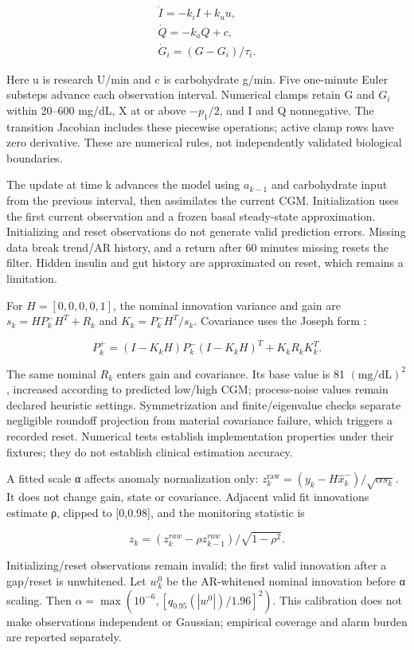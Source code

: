 \documentclass[journal,10pt,letterpaper]{IEEEtran}
\begin{document}
\[\begin{gathered}
\dot I=-k_iI+k_u u,\\ \dot Q=-k_aQ+c,\\
\dot G_i=(G-G_i)/\tau_i. 
\end{gathered}\tag{1}\]

Here u is research U/min and c is carbohydrate g/min. Five one-minute
Euler substeps advance each observation interval. Numerical clamps
retain G and \(G_i\) within 20--600 mg/dL, X at or above −\(p_1\)/2, and
I and Q nonnegative. The transition Jacobian includes these piecewise
operations; active clamp rows have zero derivative. These are numerical
rules, not independently validated biological boundaries.

The update at time k advances the model using \(a_{k-1}\) and
carbohydrate input from the previous interval, then assimilates the
current CGM. Initialization uses the first current observation and a
frozen basal steady-state approximation. Initializing and reset
observations do not generate valid prediction errors. Missing data break
trend/AR history, and a return after 60 minutes missing resets the
filter. Hidden insulin and gut history are approximated on reset, which
remains a limitation.

For \(H=[0,0,0,0,1]\), the nominal innovation variance and gain are
\(s_k=HP_k^-H^T+R_k\) and \(K_k=P_k^-H^T/s_k\). Covariance uses the
Joseph form \cite{R13}:

\[
P_k^+=(I-K_kH)P_k^-(I-K_kH)^T+K_kR_kK_k^T. \tag{2}
\]

The same nominal \(R_k\) enters gain and covariance. Its base value is
81 \((\mathrm{mg/dL})^2\), increased according to predicted low/high
CGM; process-noise values remain declared heuristic settings.
Symmetrization and finite/eigenvalue checks separate negligible roundoff
projection from material covariance failure, which triggers a recorded
reset. Numerical tests establish implementation properties under their
fixtures; they do not establish clinical estimation accuracy.

A fitted scale α affects anomaly normalization only:
\(z_k^{\mathrm{raw}}=(y_k-H\hat x_k^-)/\sqrt{\alpha s_k}\). It does not
change gain, state or covariance. Adjacent valid fit innovations
estimate ρ, clipped to {[}0,0.98{]}, and the monitoring statistic is

\[
z_k=(z_k^{raw}-\rho z_{k-1}^{raw})/\sqrt{1-\rho^2}. \tag{3}
\]

Initializing/reset observations remain invalid; the first valid
innovation after a gap/reset is unwhitened. Let \(w_k^0\) be the
AR-whitened nominal innovation before α scaling. Then
\(\alpha=\max(10^{-6},[q_{0.95}(|w^0|)/1.96]^2)\). This calibration does
not make observations independent or Gaussian; empirical coverage and
alarm burden are reported separately.
\end{document}
